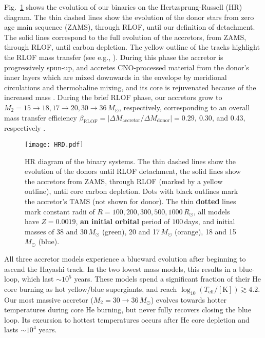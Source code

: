 \documentclass[twocolumn,twocolappendix,trackchanges]{aastex63}
\DeclareRobustCommand{\Figref}[1]{Fig.~\ref{#1}}
\begin{document}
\Figref{fig:HRD} shows the evolution of our binaries on the
Hertzsprung-Russell (HR) diagram. The thin dashed lines show the
evolution of the donor stars \citep[e.g.,][]{morton:60, gotberg:2018,
  laplace:2021} from zero age main sequence (ZAMS), through RLOF,
until our definition of detachment. The solid lines correspond to the
full evolution of the accretors, from ZAMS, through RLOF, until carbon
depletion. The yellow outline of the tracks highlight the RLOF mass
transfer (see e.g., \citealt{renzo:2021zoph}). During this phase the
accretor is progressively spun-up, and accretes CNO-processed material
from the donor's inner layers which are mixed downwards in the
envelope by meridional circulations and thermohaline mixing, and its
core is rejuvenated because of the increased mass \citep[see
also][]{sravan:2019, renzo:2021zoph, wang:2020}. During the brief RLOF
phase, our accretors grow to
$M_2=15\rightarrow 18, 17\rightarrow 20, 30\rightarrow 36\,M_\odot$,
respectively, corresponding to an overall mass transfer efficiency
$\beta_\mathrm{RLOF}=|\Delta M_\mathrm{accretor}/\Delta M_\mathrm{donor}| = 0.29,\ 0.30,$\,and
0.43, respectively \citep[see discussion in ][]{renzo:2021zoph}.

\begin{figure}[tbp]
  \texttt{[image: HRD.pdf]}
  \caption{HR diagram of the binary systems. The thin dashed lines
    show the evolution of the donors until RLOF detachment, the solid
    lines show the accretors from ZAMS, through RLOF (marked by a
    yellow outline), until core carbon depletion. Dots with black
    outlines mark the accretor's TAMS (not shown for donor). The thin
    \textcolor{green!80!black}{\bf dotted} lines mark constant radii of
    $R=100, 200, 300, 500, 1000\,R_\odot$, all models have $Z=0.0019$,
    \textcolor{green!80!black}{\bf an initial orbital} period of $100$\,days, and initial masses of 38
    and 30\,$M_\odot$ (green), 20 and 17\,$M_\odot$ (orange), 18 and
    15\,$M_\odot$ (blue).}
  \label{fig:HRD}
\end{figure}

All three accretor models experience a blueward evolution after
beginning to ascend the Hayashi track. In the two lowest mass models,
this results in a blue-loop, which last $\sim{}10^5$ years. These
models spend a significant fraction of their He core burning as hot
yellow/blue supergiants, and reach
$\log_{10}(T_\mathrm{eff}/\mathrm{[K]})\gtrsim 4.2$. Our most massive
accretor ($M_2=30\rightarrow 36\,M_\odot$) evolves towards hotter
temperatures during core He burning, but never fully recovers closing
the blue loop. Its excursion to hottest temperatures occurs after He
core depletion and lasts $\sim{}10^{4}$ years.
\end{document}
